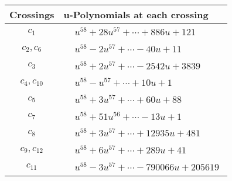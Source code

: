 \documentclass[1p]{elsarticle_modified}
\theoremstyle{definition}
\begin{document}
\begin{tabular}{m{50pt}|m{274pt}}
Crossings & \hspace{64pt}u-Polynomials at each crossing \\
\hline $$\begin{aligned}c_{1}\end{aligned}$$&$\begin{aligned}
&u^{58}+28 u^{57}+\cdots+886 u+121
\end{aligned}$\\
\hline $$\begin{aligned}c_{2},c_{6}\end{aligned}$$&$\begin{aligned}
&u^{58}-2 u^{57}+\cdots-40 u+11
\end{aligned}$\\
\hline $$\begin{aligned}c_{3}\end{aligned}$$&$\begin{aligned}
&u^{58}+2 u^{57}+\cdots-2542 u+3839
\end{aligned}$\\
\hline $$\begin{aligned}c_{4},c_{10}\end{aligned}$$&$\begin{aligned}
&u^{58}- u^{57}+\cdots+10 u+1
\end{aligned}$\\
\hline $$\begin{aligned}c_{5}\end{aligned}$$&$\begin{aligned}
&u^{58}+3 u^{57}+\cdots+60 u+88
\end{aligned}$\\
\hline $$\begin{aligned}c_{7}\end{aligned}$$&$\begin{aligned}
&u^{58}+51 u^{56}+\cdots-13 u+1
\end{aligned}$\\
\hline $$\begin{aligned}c_{8}\end{aligned}$$&$\begin{aligned}
&u^{58}+3 u^{57}+\cdots+12935 u+481
\end{aligned}$\\
\hline $$\begin{aligned}c_{9},c_{12}\end{aligned}$$&$\begin{aligned}
&u^{58}+6 u^{57}+\cdots+289 u+41
\end{aligned}$\\
\hline $$\begin{aligned}c_{11}\end{aligned}$$&$\begin{aligned}
&u^{58}-3 u^{57}+\cdots-790066 u+205619
\end{aligned}$\\
\hline
\end{tabular}\\~\\
\end{document}
